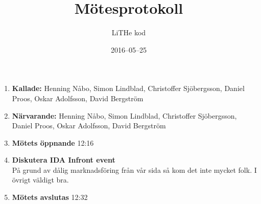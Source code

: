 \documentclass{article}
\title{Mötesprotokoll}
\date{2016--05--25}
\author{LiTHe kod}
\begin{document}
\maketitle

\begin{enumerate}
    \item \textbf{Kallade:} Henning Nåbo, Simon Lindblad, Christoffer Sjöbergsson, Daniel Proos, Oskar Adolfsson, David Bergström
    \item \textbf{Närvarande:} Henning Nåbo, Simon Lindblad, Christoffer Sjöbergsson, Daniel Proos, Oskar Adolfsson, David Bergström
    \item \textbf{Mötets öppnande} 12:16
    \item \textbf{Diskutera IDA Infront event} \\
          På grund av dålig marknadsföring från vår sida så kom det inte mycket folk.
          I övrigt väldigt bra.
    \item \textbf{Mötets avslutas} 12:32
\end{enumerate}
\end{document}
